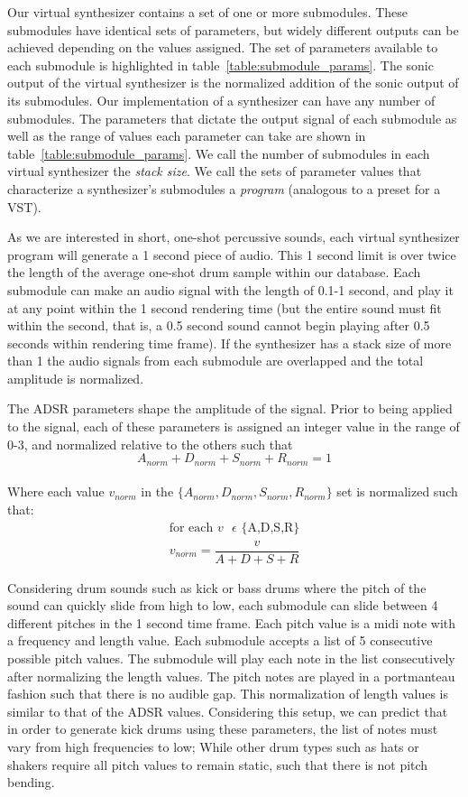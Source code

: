 \documentclass[\main/thesis.tex]{subfiles}
\begin{document}
Our virtual synthesizer contains a set of one or more submodules. These submodules have identical sets of parameters, but widely different outputs can be achieved depending on the values assigned. The set of parameters available to each submodule is highlighted in table~\ref{table:submodule_params}. The sonic output of the virtual synthesizer is the normalized addition of the sonic output of its submodules. Our implementation of a synthesizer can have any number of submodules. The parameters that dictate the output signal of each submodule as well as the range of values each parameter can take are shown in table~\ref{table:submodule_params}. We call the number of submodules in each virtual synthesizer the \textit{stack size}. We call the sets of parameter values that characterize a synthesizer's submodules a \textit{program} (analogous to a preset for a VST).  

As we are interested in short, one-shot percussive sounds, each virtual synthesizer program will generate a 1 second piece of audio. This 1 second limit is over twice the length of the average one-shot drum sample within our database. Each submodule can make an audio signal with the length of 0.1-1 second, and play it at any point within the 1 second rendering time (but the entire sound must fit within the second, that is, a 0.5 second sound cannot begin playing after 0.5 seconds within rendering time frame). If the synthesizer has a stack size of more than 1 the audio signals from each submodule are overlapped and the total amplitude is normalized.

The ADSR parameters shape the amplitude of the signal. Prior to being applied to the signal, each of these parameters is assigned an integer value in the range of 0-3, and normalized relative to the others such that \[ A_{norm} + D_{norm} + S_{norm} + R_{norm} = 1 \] \\ 
Where each value $v_{norm}$ in the $\{A_{norm}, D_{norm},S_{norm},R_{norm}\} $ set is normalized such that:
\begin{align*}
\text{for each $v$ $\epsilon$ \{A,D,S,R\}} \\
v_{norm} = \dfrac{v}{A + D + S + R}
\end{align*}

Considering drum sounds such as kick or bass drums where the pitch of the sound can quickly slide from high to low, each submodule can slide between 4 different pitches in the 1 second time frame. Each pitch value is a midi note with a frequency and length value. Each submodule accepts a list of 5 consecutive possible pitch values. The submodule will play each note in the list consecutively after normalizing the length values. The pitch notes are played in a portmanteau fashion such that there is no audible gap. This normalization of length values is similar to that of the ADSR values. Considering this setup, we can predict that in order to generate kick drums using these parameters, the list of notes must vary from high frequencies to low; While other drum types such as hats or shakers require all pitch values to remain static, such that there is not pitch bending. 
\end{document}
